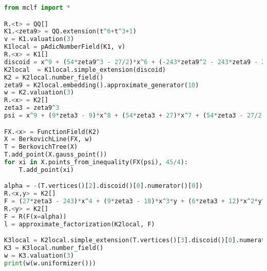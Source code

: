 \documentclass[11pt]{amsart}
\theoremstyle{definition}
\begin{document}
\begin{lstlisting}[language=Python, label={code-5}, caption=SageMath program. Used to verify that we have semistable reduction over a field extension as in Theorem \ref{theresult}]
from mclf import *

R.<t> = QQ[]
K1.<zeta9> = QQ.extension(t^6+t^3+1)
v = K1.valuation(3)
K1local = pAdicNumberField(K1, v)
R.<x> = K1[]
discoid = x^9 + (54*zeta9^3 - 27/2)*x^6 + (-243*zeta9^2 - 243*zeta9 - 243)*x^5 + (729*zeta9^2 - 729)*x^4 + (-729*zeta9^4 - 2187*zeta9^2 + 2187*zeta9 + 729)*x^3 + (10935*zeta9^5 + 4374*zeta9^4 - 2187*zeta9^3 + 2187*zeta9^2 + 2187*zeta9 + 15309)*x^2 + (13122*zeta9^5 - 6561/2*zeta9^4 - 13122*zeta9^2 + 6561/2*zeta9)*x - 13122*zeta9^5 + 6561/2*zeta9^4 - 2187*zeta9^3 + 13122*zeta9^2 - 32805*zeta9 + 24057/2
K2local  = K1local.simple_extension(discoid)
K2 = K2local.number_field()
zeta9 = K2local.embedding().approximate_generator(10)
w = K2.valuation(3)
R.<x> = K2[]
zeta3 = zeta9^3
psi = x^9 + (9*zeta3 - 9)*x^8 + (54*zeta3 + 27)*x^7 + (54*zeta3 - 27/2)*x^6 + (243*zeta3 + 972)*x^5 + 729*zeta3*x^4 + (2916*zeta3 - 1458)*x^3 + (37179*zeta3 + 41553)*x^2 + (6561*zeta3 + 6561/8)*x - 63423*zeta3 + 155277

FX.<x> = FunctionField(K2)
X = BerkovichLine(FX, w)
T = BerkovichTree(X)
T.add_point(X.gauss_point())
for xi in X.points_from_inequality(FX(psi), 45/4):
	T.add_point(xi)

alpha = -(T.vertices()[2].discoid()[0].numerator()[0])
R.<x,y> = K2[]
F = (27*zeta3 - 243)*x^4 + (9*zeta3 - 18)*x^3*y + (6*zeta3 + 12)*x^2*y^2 + (-1458*zeta3 - 999)*x^3 + (-108*zeta3 - 108)*x^2*y + (36*zeta3 + 9)*x*y^2 + y^3 + (-1215*zeta3 + 1701)*x^2 + (-162*zeta3 + 81)*x*y - 27*y^2 + (1944*zeta3 + 2430)*x + (81*zeta3 + 162)*y + (729*zeta3)
R.<y> = K2[]
F = R(F(x=alpha))
l = approximate_factorization(K2local, F)

K3local = K2local.simple_extension(T.vertices()[3].discoid()[0].numerator())
K3 = K3local.number_field()
w = K3.valuation(3)
print(w(w.uniformizer()))
\end{lstlisting}
\end{document}
